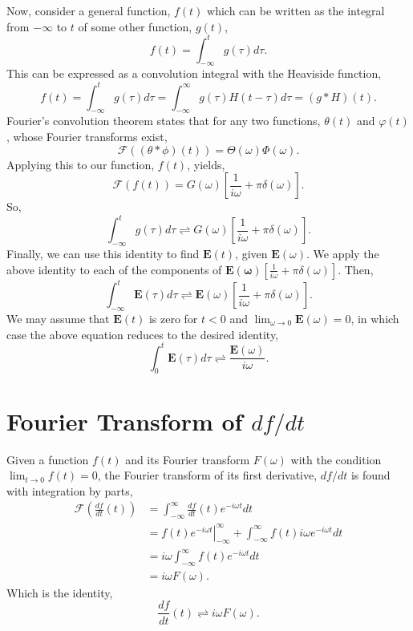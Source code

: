 \documentclass[12pt,twocolumn]{article}
\begin{document}
Now, consider a general function, $f(t)$ which can be written as the integral from $-\infty$ to $t$ of some other function, $g(t)$,
\begin{equation}
f(t)=\int_{-\infty}^{t}g(\tau)d\tau.
\end{equation}
This can be expressed as a convolution integral with the Heaviside function,
\begin{equation}
f(t)=\int_{-\infty}^{t}g(\tau)d\tau = \int_{-\infty}^{\infty}g(\tau)H(t-\tau)d\tau=(g*H)(t).
\end{equation}
Fourier's convolution theorem states that for any two functions, $\theta(t)$ and $\varphi(t)$, whose Fourier transforms exist,
\begin{equation}
\mathcal{F}((\theta*\phi)(t)) = \Theta(\omega)\varPhi(\omega).
\end{equation}
Applying this to our function, $f(t)$, yields,
\begin{equation}
\mathcal{F}(f(t)) = G(\omega)\left[\frac{1}{i\omega}+\pi\delta(\omega)\right].
\end{equation}
So,
\begin{equation}
\int_{-\infty}^{t}g(\tau)d\tau\rightleftharpoons G(\omega)\left[\frac{1}{i\omega}+\pi\delta(\omega)\right].
\end{equation}
Finally, we can use this identity to find $\mathbf{E}(t)$, given $\mathbf{E}(\omega)$. We apply the above identity to each of the components of $\mathbf{E(\omega)}\left[\frac{1}{i\omega}+\pi\delta(\omega)\right]$. Then,
\begin{equation}
\int_{-\infty}^{t}\mathbf{E}(\tau)d\tau\rightleftharpoons \mathbf{E}(\omega)\left[\frac{1}{i\omega}+\pi\delta(\omega)\right].
\end{equation}
We may assume that $\mathbf{E}(t)$ is zero for $t<0$ and $\lim_{\omega\rightarrow 0}\mathbf{E}(\omega)=0$, in which case the above equation reduces to the desired identity,
\begin{equation}
\int_0^t\mathbf{E}(\tau)d\tau\rightleftharpoons \frac{\mathbf{E}(\omega)}{i\omega}.
\end{equation}
\newpage
\section{Fourier Transform of $df/dt$}
\label{ap:fourier2}
Given a function $f(t)$ and its Fourier transform $F(\omega)$ with the condition $\lim_{t\rightarrow 0}f(t) = 0$, the Fourier transform of its first derivative, $df/dt$ is found with integration by parts,
\begin{align*}
\mathcal{F}\left(\frac{df}{dt}(t)\right) &= \int_{-\infty}^{\infty}\frac{df}{dt}(t)e^{-i\omega t}dt \\
& = \left.f(t)e^{-i\omega t}\right|_{-\infty}^{\infty} + \int_{-\infty}^{\infty}f(t)i\omega e^{-i\omega t}dt\\
& = i\omega \int_{-\infty}^{\infty}f(t)e^{-i\omega t}dt\\
& = i\omega F(\omega).
\end{align*}
Which is the identity,
\begin{equation}
\frac{df}{dt}(t) \rightleftharpoons i\omega F(\omega).
\end{equation}
\end{document}
